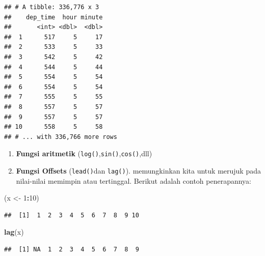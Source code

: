 \documentclass[]{book}
\newenvironment{Shaded}{\begin{snugshade}}{\end{snugshade}}
\newcommand{\KeywordTok}[1]{\textcolor[rgb]{0.13,0.29,0.53}{\textbf{#1}}}
\newcommand{\DataTypeTok}[1]{\textcolor[rgb]{0.13,0.29,0.53}{#1}}
\newcommand{\DecValTok}[1]{\textcolor[rgb]{0.00,0.00,0.81}{#1}}
\newcommand{\StringTok}[1]{\textcolor[rgb]{0.31,0.60,0.02}{#1}}
\newcommand{\OperatorTok}[1]{\textcolor[rgb]{0.81,0.36,0.00}{\textbf{#1}}}
\newcommand{\NormalTok}[1]{#1}
\providecommand{\tightlist}{%
  \setlength{\itemsep}{0pt}\setlength{\parskip}{0pt}}
\begin{document}
\begin{Shaded}
\end{Shaded}

\begin{verbatim}
## # A tibble: 336,776 x 3
##    dep_time  hour minute
##       <int> <dbl>  <dbl>
##  1      517     5     17
##  2      533     5     33
##  3      542     5     42
##  4      544     5     44
##  5      554     5     54
##  6      554     5     54
##  7      555     5     55
##  8      557     5     57
##  9      557     5     57
## 10      558     5     58
## # ... with 336,766 more rows
\end{verbatim}

\begin{enumerate}
\def\labelenumi{\arabic{enumi}.}
\setcounter{enumi}{1}
\tightlist
\item
  \textbf{Fungsi aritmetik}
  (\texttt{log()},\texttt{sin()},\texttt{cos()},dll)
\item
  \textbf{Fungsi Offsets} (\texttt{lead()}dan \texttt{lag()}).
  memungkinkan kita untuk merujuk pada nilai-nilai memimpin atau
  tertinggal. Berikut adalah contoh penerapannya:
\end{enumerate}

\begin{Shaded}
\begin{Highlighting}[]
\NormalTok{(x <-}\StringTok{ }\DecValTok{1}\OperatorTok{:}\DecValTok{10}\NormalTok{)}
\end{Highlighting}
\end{Shaded}

\begin{verbatim}
##  [1]  1  2  3  4  5  6  7  8  9 10
\end{verbatim}

\begin{Shaded}
\begin{Highlighting}[]
\KeywordTok{lag}\NormalTok{(x)}
\end{Highlighting}
\end{Shaded}

\begin{verbatim}
##  [1] NA  1  2  3  4  5  6  7  8  9
\end{verbatim}
\end{document}
